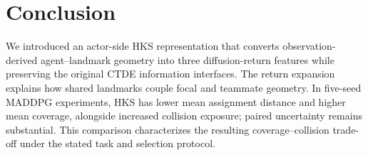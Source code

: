 \documentclass{article}
\begin{document}
\section{Conclusion}
We introduced an actor-side HKS representation that converts observation-derived agent--landmark geometry into three diffusion-return features while preserving the original CTDE information interfaces. The return expansion explains how shared landmarks couple focal and teammate geometry. In five-seed MADDPG experiments, HKS has lower mean assignment distance and higher mean coverage, alongside increased collision exposure; paired uncertainty remains substantial. This comparison characterizes the resulting coverage--collision trade-off under the stated task and selection protocol.

\clearpage


\end{document}
